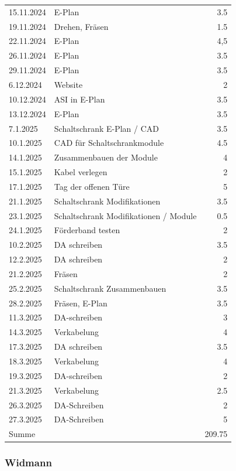\begin{longtable}{|l|p{10cm}|r|}
15.11.2024	&	E-Plan	&	3.5	\\
19.11.2024	&	Drehen, Fräsen	&	1.5	\\
22.11.2024	&	E-Plan	&	4,5	\\
26.11.2024	&	E-Plan	&	3.5	\\
29.11.2024	&	E-Plan	&	3.5	\\
6.12.2024	&	Website	&	2	\\
10.12.2024	&	ASI in E-Plan	&	3.5	\\
13.12.2024	&	E-Plan 	&	3.5	\\
7.1.2025	&	Schaltschrank E-Plan / CAD	&	3.5	\\
10.1.2025	&	CAD für Schaltschrankmodule	&	4.5	\\
14.1.2025	&	Zusammenbauen der Module	&	4	\\
15.1.2025	&	Kabel verlegen	&	2	\\
17.1.2025	&	Tag der offenen Türe	&	5	\\
21.1.2025	&	Schaltschrank Modifikationen	&	3.5	\\
23.1.2025	&	Schaltschrank Modifikationen / Module	&	0.5	\\
24.1.2025	&	 Förderband testen	&	2	\\
10.2.2025	&	DA schreiben	&	3.5	\\
12.2.2025	&	DA schreiben	&	2	\\
21.2.2025	&	Fräsen	&	2	\\
25.2.2025	&	Schaltschrank Zusammenbauen	&	3.5	\\
28.2.2025	&	Fräsen, E-Plan	&	3.5	\\
11.3.2025	&	DA-schreiben	&	3	\\
14.3.2025	&	Verkabelung	&	4	\\
17.3.2025	&	DA schreiben	&	3.5	\\
18.3.2025	&	Verkabelung	&	4	\\
19.3.2025	&	DA-schreiben 	&	2	\\
21.3.2025	&	Verkabelung	&	2.5	\\
26.3.2025	&	DA-Schreiben	&	2	\\
27.3.2025 &	DA-Schreiben	&	5	\\

\hline
\hline
Summe & & 209.75 \\

\end{longtable}
\newpage

\subsubsection{Widmann}

